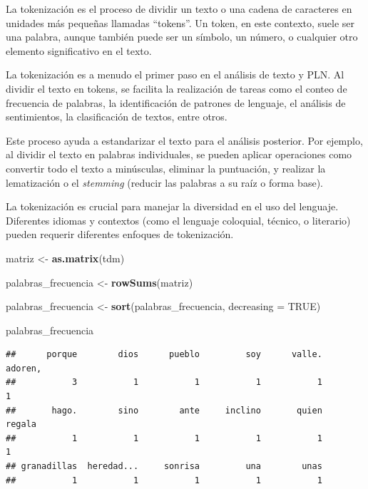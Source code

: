 \documentclass[
]{article}
\newenvironment{Shaded}{\begin{snugshade}}{\end{snugshade}}
\newcommand{\AttributeTok}[1]{\textcolor[rgb]{0.13,0.29,0.53}{#1}}
\newcommand{\ConstantTok}[1]{\textcolor[rgb]{0.56,0.35,0.01}{#1}}
\newcommand{\FunctionTok}[1]{\textcolor[rgb]{0.13,0.29,0.53}{\textbf{#1}}}
\newcommand{\NormalTok}[1]{#1}
\newcommand{\OtherTok}[1]{\textcolor[rgb]{0.56,0.35,0.01}{#1}}
\begin{document}
La tokenización es el proceso de dividir un texto o una cadena de
caracteres en unidades más pequeñas llamadas ``tokens''. Un token, en
este contexto, suele ser una palabra, aunque también puede ser un
símbolo, un número, o cualquier otro elemento significativo en el texto.

La tokenización es a menudo el primer paso en el análisis de texto y
PLN. Al dividir el texto en tokens, se facilita la realización de tareas
como el conteo de frecuencia de palabras, la identificación de patrones
de lenguaje, el análisis de sentimientos, la clasificación de textos,
entre otros.

Este proceso ayuda a estandarizar el texto para el análisis posterior.
Por ejemplo, al dividir el texto en palabras individuales, se pueden
aplicar operaciones como convertir todo el texto a minúsculas, eliminar
la puntuación, y realizar la lematización o el \emph{stemming} (reducir
las palabras a su raíz o forma base).

La tokenización es crucial para manejar la diversidad en el uso del
lenguaje. Diferentes idiomas y contextos (como el lenguaje coloquial,
técnico, o literario) pueden requerir diferentes enfoques de
tokenización.

\begin{Shaded}
\begin{Highlighting}[]
\NormalTok{matriz }\OtherTok{\textless{}{-}} \FunctionTok{as.matrix}\NormalTok{(tdm)}

\NormalTok{palabras\_frecuencia }\OtherTok{\textless{}{-}} \FunctionTok{rowSums}\NormalTok{(matriz)}

\NormalTok{palabras\_frecuencia }\OtherTok{\textless{}{-}} \FunctionTok{sort}\NormalTok{(palabras\_frecuencia, }\AttributeTok{decreasing =} \ConstantTok{TRUE}\NormalTok{)}

\NormalTok{palabras\_frecuencia}
\end{Highlighting}
\end{Shaded}

\begin{verbatim}
##      porque        dios      pueblo         soy      valle.     adoren, 
##           3           1           1           1           1           1 
##       hago.        sino        ante     inclino       quien      regala 
##           1           1           1           1           1           1 
## granadillas  heredad...     sonrisa         una        unas 
##           1           1           1           1           1
\end{verbatim}
\end{document}
